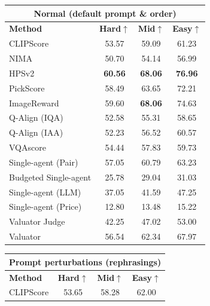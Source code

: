 \begin{table}[t]
\centering
\scriptsize
\setlength{\tabcolsep}{2.5pt}
\renewcommand{\arraystretch}{0.85}

\begin{minipage}[t]{0.32\textwidth}
\centering
\begin{tabular}{lccc}
\toprule
\multicolumn{4}{c}{\textbf{Normal (default prompt \& order)}}\\
\midrule
\textbf{Method} & \textbf{Hard}$\uparrow$ & \textbf{Mid}$\uparrow$ & \textbf{Easy}$\uparrow$ \\
\midrule
CLIPScore                    & 53.57 & 59.09 & 61.23 \\
NIMA                         & 50.70 & 54.14 & 56.99 \\
HPSv2                        & \textbf{60.56} & \textbf{68.06} & \textbf{76.96} \\
PickScore                    & 58.49 & 63.65 & 72.21 \\
ImageReward                  & 59.60 & \textbf{68.06} & 74.63 \\
Q-Align (IQA)                & 52.58 & 55.31 & 58.65 \\
Q-Align (IAA)                & 52.23 & 56.52 & 60.57 \\
VQAscore                     & 54.44 & 57.83 & 59.73 \\
\midrule
Single-agent (Pair)          & 57.05 & 60.79 & 63.23 \\
Budgeted Single-agent        & 25.78 & 29.04 & 31.03 \\
Single-agent (LLM)           & 37.05 & 41.59 & 47.25 \\
Single-agent (Price)         & 12.80 & 13.48 & 15.22 \\
Valuator Judge               & 42.25 & 47.02 & 53.00 \\
Valuator                     & 56.54 & 62.34 & 67.97 \\
\bottomrule
\end{tabular}
\end{minipage}\hfill
\begin{minipage}[t]{0.32\textwidth}
\centering
\begin{tabular}{lccc}
\toprule
\multicolumn{4}{c}{\textbf{Prompt perturbations (rephrasings)}}\\
\midrule
\textbf{Method} & \textbf{Hard}$\uparrow$ & \textbf{Mid}$\uparrow$ & \textbf{Easy}$\uparrow$ \\
\midrule
CLIPScore                    & 53.65 & 58.28 & 62.00 \\

\end{tabular}
\end{minipage}
\end{table}
